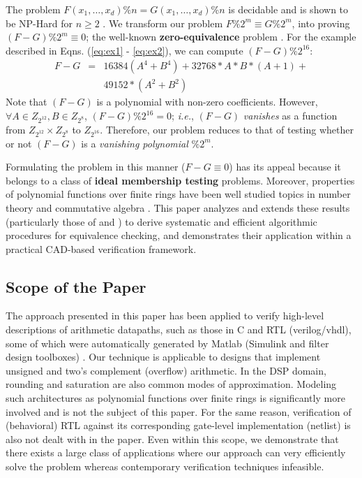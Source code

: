 The problem $F(x_1, \ldots, x_d)\% n = G(x_1, \ldots, x_d) \% n$ is
decidable and is shown to be NP-Hard for $n \geq 2$ \cite{ibarra}. We
transform our problem $F \%2^m \equiv G\%2^m$, into proving $(F-G)
\%2^m \equiv 0$; the well-known {\bf zero-equivalence} problem
\cite{ibarra}. For the example described in Eqns. (\ref{eq:ex1} -
\ref{eq:ex2}), we can compute $(F-G) \%2^{16}$: 
%
{\small
\begin{eqnarray}
F - G &=& 16384 (A^4 + B^4) + 32768 * A * B *(A + 1) + \nonumber\\
      & & 49152 * (A^2 + B^2)
\end{eqnarray}
}
%
Note that $(F-G)$ is a polynomial with non-zero
coefficients. However,  $ \forall A \in Z_{2^{12}}, B \in Z_{2^{8}}$,
$( F-G ) \%2^{16} = 0$; {\it i.e.}, $( F-G )$
{\it vanishes} as a function from $Z_{2^{12}} \times Z_{2^8}$ to
$Z_{2^{16}}$. Therefore, our problem reduces to that of testing
whether or not $(F-G)$ is a {\it vanishing polynomial} $\%2^m$. 

Formulating the problem in this manner ($ F-G \equiv 0$) has its
appeal because it belongs to a class of {\bf ideal membership testing}
problems. Moreover, properties of polynomial functions over finite
rings have been well studied topics in number theory and commutative
algebra \cite{niven} \cite{singmaster} \cite{chen_95} \cite{chen_96}.
This paper analyzes and extends these results (particularly those of
\cite{singmaster} and \cite{chen_96}) to derive systematic and
efficient algorithmic procedures for equivalence checking, and
demonstrates their application within a practical CAD-based
verification framework.

\subsection{Scope of the Paper} 
The approach presented in this paper has been applied to verify
high-level descriptions of arithmetic datapaths, such as those in {\sc
C} and {\sc RTL} ({\sc verilog/vhdl}), some of which were
automatically generated by {\sc Matlab} (Simulink and filter design
toolboxes) \cite{matlab}. Our technique is applicable to designs that
implement unsigned and two's complement (overflow) arithmetic. In the
DSP domain, rounding and saturation are also common modes of
approximation. Modeling such architectures as polynomial functions
over finite rings is significantly more involved and is not the
subject of this paper. For the same reason, verification of
(behavioral) RTL against its corresponding gate-level implementation
(netlist) is also not dealt with in the paper. Even within this scope,
we demonstrate that there exists a large class of applications where
our approach can very efficiently solve the problem whereas
contemporary verification techniques infeasible.

